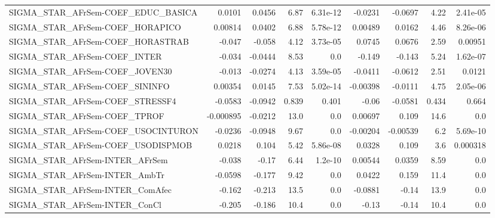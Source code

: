 \begin{tabular}{lrrrrrrrr}
SIGMA\_STAR\_AFrSem-COEF\_EDUC\_BASICA    &      0.0101 &       0.0456 &     6.87 & 6.31e-12 &    -0.0231 &     -0.0697 &         4.22 &      2.41e-05 \\
SIGMA\_STAR\_AFrSem-COEF\_HORAPICO       &     0.00814 &       0.0402 &     6.88 & 5.78e-12 &    0.00489 &      0.0162 &         4.46 &      8.26e-06 \\
SIGMA\_STAR\_AFrSem-COEF\_HORASTRAB      &      -0.047 &       -0.058 &     4.12 & 3.73e-05 &     0.0745 &      0.0676 &         2.59 &       0.00951 \\
SIGMA\_STAR\_AFrSem-COEF\_INTER          &      -0.034 &      -0.0444 &     8.53 &      0.0 &     -0.149 &      -0.143 &         5.24 &      1.62e-07 \\
SIGMA\_STAR\_AFrSem-COEF\_JOVEN30        &      -0.013 &      -0.0274 &     4.13 & 3.59e-05 &    -0.0411 &     -0.0612 &         2.51 &        0.0121 \\
SIGMA\_STAR\_AFrSem-COEF\_SININFO        &     0.00354 &       0.0145 &     7.53 & 5.02e-14 &   -0.00398 &     -0.0111 &         4.75 &      2.05e-06 \\
SIGMA\_STAR\_AFrSem-COEF\_STRESSF4       &     -0.0583 &      -0.0942 &    0.839 &    0.401 &      -0.06 &     -0.0581 &        0.434 &         0.664 \\
SIGMA\_STAR\_AFrSem-COEF\_TPROF          &   -0.000895 &      -0.0212 &     13.0 &      0.0 &    0.00697 &       0.109 &         14.6 &           0.0 \\
SIGMA\_STAR\_AFrSem-COEF\_USOCINTURON    &     -0.0236 &      -0.0948 &     9.67 &      0.0 &   -0.00204 &    -0.00539 &          6.2 &      5.69e-10 \\
SIGMA\_STAR\_AFrSem-COEF\_USODISPMOB     &      0.0218 &        0.104 &     5.42 & 5.86e-08 &     0.0328 &       0.109 &          3.6 &      0.000318 \\
SIGMA\_STAR\_AFrSem-INTER\_AFrSem        &      -0.038 &        -0.17 &     6.44 &  1.2e-10 &    0.00544 &      0.0359 &         8.59 &           0.0 \\
SIGMA\_STAR\_AFrSem-INTER\_AmbTr         &     -0.0598 &       -0.177 &     9.42 &      0.0 &     0.0422 &       0.159 &         11.4 &           0.0 \\
SIGMA\_STAR\_AFrSem-INTER\_ComAfec       &      -0.162 &       -0.213 &     13.5 &      0.0 &    -0.0881 &       -0.14 &         13.9 &           0.0 \\
SIGMA\_STAR\_AFrSem-INTER\_ConCl         &      -0.205 &       -0.186 &     10.4 &      0.0 &      -0.13 &       -0.14 &         10.4 &           0.0 \\

\end{tabular}
